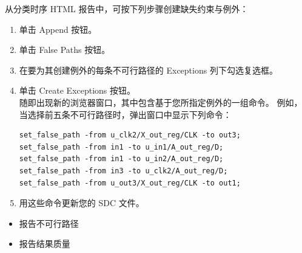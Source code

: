 从分类时序 HTML 报告中，可按下列步骤创建缺失约束与例外：
\begin{enumerate}
  \item 单击 Append 按钮。
  \item 单击 False Paths 按钮。
  \item 在要为其创建例外的每条不可行路径的 Exceptions 列下勾选复选框。
  \item 单击 Create Exceptions 按钮。\\
        随即出现新的浏览器窗口，其中包含基于您所指定例外的一组命令。
        例如，当选择前五条不可行路径时，弹出窗口中显示下列命令：
\begin{lstlisting}
set_false_path -from u_clk2/X_out_reg/CLK -to out3;
set_false_path -from in1 -to u_in1/A_out_reg/D;
set_false_path -from in1 -to u_in2/A_out_reg/D;
set_false_path -from in3 -to u_clk2/A_out_reg/D;
set_false_path -from u_out3/X_out_reg/CLK -to out1;
\end{lstlisting}
  \item 用这些命令更新您的 SDC 文件。
\end{enumerate}

\begin{seeAlsoBox}
\begin{itemize}
  \item 报告不可行路径
  \item 报告结果质量
\end{itemize}
\end{seeAlsoBox}
